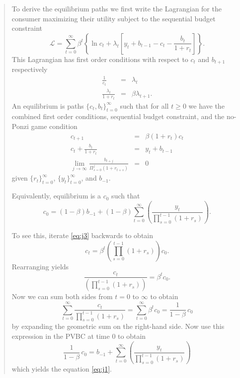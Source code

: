 \begin{exercise}
\begin{quote}
\begin{enumerate}
To derive the equilibrium paths we first write the Lagrangian for the consumer maximizing their utility subject to the sequential budget constraint
\[
\mathcal{L} = \sum_{t=0}^{\infty} \beta^t \left\{
\ln c_t + \lambda_t \left[ y_t  + b_{t-1} - c_t - \frac{b_t}{1+r_t} \right]\right\}.
\]
This Lagrangian has first order conditions with respect to $c_t$ and $b_{t+1}$ respectively
\begin{eqnarray*}
\frac{1}{c_t}& = &\lambda_t\\
\frac{\lambda_t}{1+r_t} &=& \beta \lambda_{t+1}.
\end{eqnarray*}
An equilibrium is paths $\{c_t,  b_t\}_{t=0}^{\infty}$ such that for all $t\ge 0$ we have the combined first order conditions, sequential budget constraint, and the no-Ponzi game condition
\begin{eqnarray}
\label{eq:j3}
c_{t+1}&=& \beta (1+r_t)c_t\\
\label{eq:bc}
c_t + \frac{b_t}{1+r_t}& = &y_t  + b_{t-1}\\
\label{eq:tvc}
\lim_{j\rightarrow \infty} \frac{b_{t+j}}{\Pi_{s=0}^j (1+r_{t+s})}&= &0 
\end{eqnarray}
given $\{r_t\}_{t=0}^{\infty}$, $\{y_t\}_{t=0}^{\infty}$, and $b_{-1}$.

Equivalently, equilibrium is a $c_0$ such that 
\begin{equation}
c_0 = (1-\beta) b_{-1}
+ (1-\beta)  \sum_{t=0}^{\infty} 
\left(
\frac
{y_{t} }
{\displaystyle \prod_{s=0}^{t-1} (1+r_{s})} 
\right).
\label{eq:j1}
\end{equation}

To see this, iterate \eqref{eq:j3} backwards to obtain
\begin{equation}
\label{eq:j2}
c_t = \beta^t\left( \prod_{s=0}^{t-1} (1+r_s)\right) c_0.
\end{equation}
Rearranging yields 
\begin{equation*}
    \frac{c_t}{\left( \prod_{s=0}^{t-1} (1+r_s)\right)} = \beta^t c_0.
\end{equation*}
Now we can sum both sides from $t=0$ to $\infty$ to obtain
\begin{equation*}
    \sum_{t=0}^{\infty} 
    \frac{c_{t}}{\prod_{s=0}^{t-1}(1+r_{s})} 
    = \sum_{t=0}^{\infty} \beta^t c_0 = \frac{1}{1-\beta}\, c_0
\end{equation*}
by expanding the geometric sum on the right-hand side. Now use this expression in the PVBC at time 0 to obtain 
\begin{equation*}
    \frac{1}{1-\beta}\, c_0 = b_{-1} + \sum_{t=0}^{\infty} 
    \left(
    \frac{y_{t}}{\prod_{s=0}^{t-1} (1+r_{s})} 
    \right)
\end{equation*}
which yields the equation \eqref{eq:j1}.


\end{enumerate}
\end{quote}
\end{exercise}
